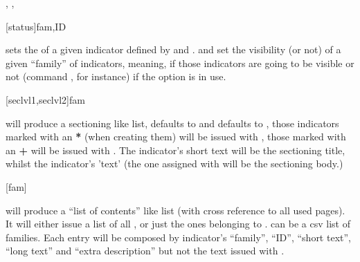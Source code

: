 \documentclass[article,nogeometry,english,tocdepth=3,secdepth=3]{ufrgscca} %
\begin{document}
\begin{codedescribe}{\indsetstatus, \indsetview, \indsethide}
	\begin{codesyntax}%
	\tsmacro{\indsetstatus}[status]{fam,ID}
\end{codesyntax}
 sets the  of a given indicator defined by  and . \tsmacro{\indsetview}{} and  set the visibility (or not) of a given “family” of indicators, meaning, if those indicators are going to be visible or not (command \tsmacro{\indref}{}, for instance) if the option  is in use.
\end{codedescribe}

\begin{codedescribe}{\lstind}
	\begin{codesyntax}%
	\tsmacro{\lstind}[seclvl1,seclvl2]{fam}
\end{codesyntax}
\tsmacro{\lstind}{} will produce a sectioning like list,  defaults to \tsmacro{\section}{} and  defaults to \tsmacro{\subsection}{}, those indicators marked with an \textbf{*} (when creating them) will be issued with , those marked with an \textbf{+} will be issued with . The indicator's short text will be the sectioning title, whilst the indicator's 'text' (the one assigned with  will be the sectioning body.)
\end{codedescribe}

\begin{codedescribe}{\PrintIndicators}
    \begin{codesyntax}%
        \tsmacro{\PrintIndicators}[fam]{}
    \end{codesyntax}
    \tsmacro{\PrintIndicators}{} will produce a “list of contents” like list (with cross reference to all used \tsmacro{\indref}{} pages). It will either issue a list of all \tsmacro{\declareindicator}, or just the ones belonging to .  can be a csv list of families. Each entry will be composed by indicator's “family”, “ID”, “short text”, “long text” and “extra description” but not the text issued with \tsmacro{\indicatorText}{}.
\end{codedescribe}
\end{document}
